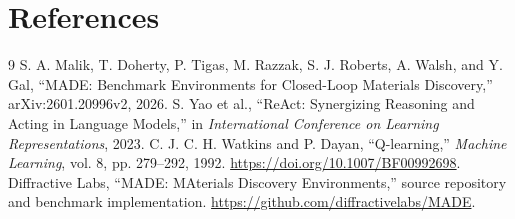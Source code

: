 \documentclass[11pt,a4paper]{article}
\begin{document}
\clearpage
\section*{References}
\begin{thebibliography}{9}
\setlength{\itemsep}{2pt}
S. A. Malik, T. Doherty, P. Tigas, M. Razzak, S. J. Roberts, A. Walsh, and
Y. Gal, ``MADE: Benchmark Environments for Closed-Loop Materials Discovery,''
arXiv:2601.20996v2, 2026.
S. Yao et al., ``ReAct: Synergizing Reasoning and Acting in Language Models,''
in \emph{International Conference on Learning Representations}, 2023.
C. J. C. H. Watkins and P. Dayan, ``Q-learning,''
\emph{Machine Learning}, vol. 8, pp. 279--292, 1992.
\url{https://doi.org/10.1007/BF00992698}.
Diffractive Labs, ``MADE: MAterials Discovery Environments,'' source
repository and benchmark implementation.
\url{https://github.com/diffractivelabs/MADE}.
\end{thebibliography}
\end{document}
